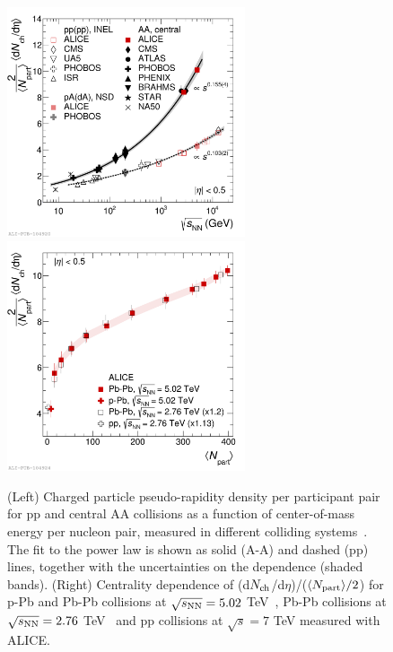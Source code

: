 \begin{figure}[!t]
  \centering
  \includegraphics[width=7cm]{FigCap1/dNchdEtaVsEnergy.pdf}
  \includegraphics[width=7cm]{FigCap1/dNchdEtaVsNpart.pdf}
  \caption{(Left) Charged particle pseudo-rapidity density per participant pair for pp and central AA collisions as a function of center-of-mass energy per nucleon pair, measured in different colliding systems~\cite{Adam:2015ptt}. The fit to the power law is shown as solid (A-A) and dashed (pp) lines, together with the uncertainties on the dependence (shaded bands). (Right) Centrality dependence of (d$N_{\rm ch}$/d$\eta$)/($\langle N_{\rm part} \rangle/2$) for p-Pb and Pb-Pb collisions at $\sqrt{s_{\rm NN}}=5.02$ TeV~\cite{ALICE:2012xs,Adam:2015gka}, Pb-Pb collisions at $\sqrt{s_{\rm NN}}=2.76$ TeV~\cite{Aamodt:2010cz} and pp collisions at $\sqrt{s}=7$ TeV measured with ALICE.}
  \label{fig:dNchdEta}
\end{figure}


